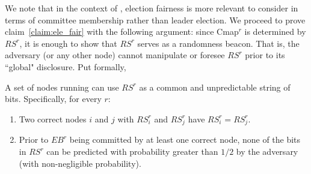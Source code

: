 We note that in the context of \nameNS, election fairness is more relevant to consider in terms of committee membership rather than leader election. 
We proceed to prove claim~\ref{claim:ele_fair} with the following argument: since Cmap$^r$ is determined by $RS^r$, it is enough to show that $RS^r$ serves as a randomness beacon. That is, the adversary (or any other node) cannot manipulate or foresee $RS^r$ prior to its ``global" disclosure. Put formally,
\begin{lemma}
A set of nodes running \name can use $RS^r$ as a common and unpredictable string of bits. Specifically, for every $r$:
\begin{enumerate}
\item Two correct nodes $i$ and $j$ with $RS^r_i$ and $RS^r_j$ have $RS^r_i=RS^r_j$.
\item Prior to $EB^r$ being committed by at least one correct node, none of the bits in $RS^r$ can be predicted with probability greater than $1/2$ by the adversary (with non-negligible probability). 
\end{enumerate}  
\end{lemma}

